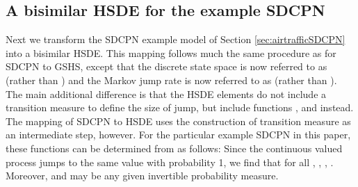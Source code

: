 \documentclass[copyright,creativecommons]{eptcs}
\begin{document}
\subsection{A bisimilar HSDE for the example SDCPN}\label{sec:sdcpnexample2}
Next we transform the SDCPN example model of Section \ref{sec:airtrafficSDCPN}
into a bisimilar HSDE. This mapping follows much the same procedure
as for SDCPN to GSHS,
except that the discrete state space is now referred to as 
(rather than ) and the Markov jump rate is now referred to as
 (rather than ). The main additional difference
is that the HSDE elements do not include a transition measure  to
define the size of jump, but include functions ,  and
 instead. The mapping of SDCPN to HSDE uses the construction of
transition measure  as an intermediate step, however.
For the particular example SDCPN in this paper, these
functions can be determined from  as follows:
Since the continuous valued process
jumps to the same value with probability 1, we find that
 for all , , ,
. Moreover,  and  may be any given invertible probability measure.
\end{document}
